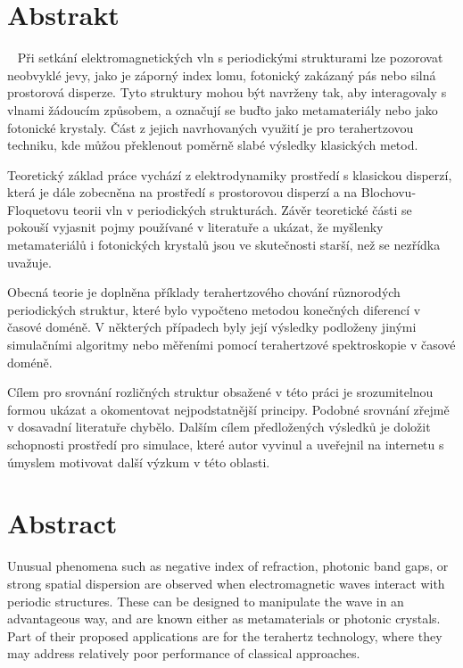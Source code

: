 
\vspace{-20mm}
\chapter*{Abstrakt}
\noindent ~
Při setkání elektromagnetických vln s periodickými strukturami lze pozorovat neobvyklé jevy, jako je záporný index lomu, fotonický zakázaný pás nebo silná prostorová disperze. Tyto struktury mohou být navrženy tak, aby interagovaly s vlnami žádoucím způsobem, a označují se buďto jako metamateriály nebo jako fotonické krystaly. Část z jejich navrhovaných využití je pro terahertzovou techniku, kde můžou překlenout poměrně slabé výsledky klasických metod.  

Teoretický základ práce vychází z elektrodynamiky prostředí s klasickou disperzí, která je dále zobecněna na prostředí s prostorovou disperzí a na Blochovu-Floquetovu teorii vln v periodických strukturách. Závěr teoretické části se pokouší vyjasnit pojmy používané v literatuře a ukázat, že myšlenky metamateriálů i fotonických krystalů jsou ve skutečnosti starší, než se nezřídka uvažuje.

Obecná teorie je doplněna příklady terahertzového chování různorodých periodických struktur, které bylo vypočteno metodou konečných diferencí v časové doméně. V některých případech byly její výsledky podloženy jinými simulačními algoritmy nebo měřeními pomocí terahertzové spektroskopie v časové doméně.

Cílem pro srovnání rozličných struktur obsažené v této práci je srozumitelnou formou ukázat a okomentovat nejpodstatnější principy. Podobné srovnání zřejmě v dosavadní literatuře chybělo. Dalším cílem předložených výsledků je doložit schopnosti prostředí pro simulace, které autor vyvinul a uveřejnil na internetu s úmyslem motivovat další výzkum v této oblasti. 

\vspace{0mm}
{\let\clearpage\relax\chapter*{Abstract}}
\noindent
Unusual phenomena such as negative index of refraction, photonic band gaps, or strong spatial dispersion are observed when electromagnetic waves interact with periodic structures. These can be designed to manipulate the wave in an advantageous way, and are known either as metamaterials or photonic crystals. Part of their proposed applications are for the terahertz technology, where they may address relatively poor performance of classical approaches.

